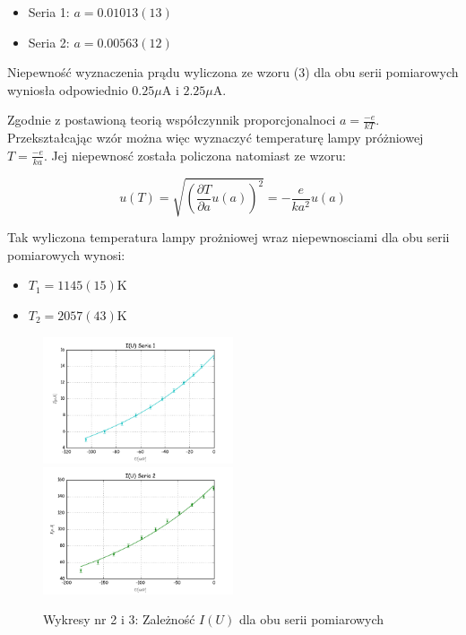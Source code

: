 \documentclass[a4paper,10pt]{article}
\begin{document}
\begin{itemize}
  \item Seria 1: $a = 0.01013(13)$
  \item Seria 2: $a = 0.00563(12)$
\end{itemize}

Niepewność wyznaczenia prądu wyliczona ze wzoru (3) dla obu serii pomiarowych wyniosła odpowiednio $0.25\mu$A i $2.25\mu$A.

Zgodnie z postawioną teorią współczynnik proporcjonalnoci $a = \frac{-e}{kT}$. Przekształcając wzór można więc wyznaczyć temperaturę lampy próżniowej $T = \frac{-e}{ka}$. Jej niepewnosć została  policzona natomiast ze wzoru:

\begin{equation}
u(T) = \sqrt{(\frac{\partial T}{\partial a} u(a))^2 } = -\frac{e}{ka^2} u(a)
\end{equation}

Tak wyliczona temperatura lampy prożniowej wraz niepewnosciami dla obu serii pomiarowych wynosi:

\begin{itemize}
  \item $T_1 = 1145(15)$K
  \item $T_2 = 2057(43)$K
\end{itemize}

\begin{figure}[H]
\includegraphics[width=0.5\textwidth]{zarzenieU1.png}
\includegraphics[width=0.5\textwidth]{zarzenieU2.png}
\caption{Wykresy nr 2 i 3: Zależność $I(U)$ dla obu serii pomiarowych}
\end{figure}
\end{document}
